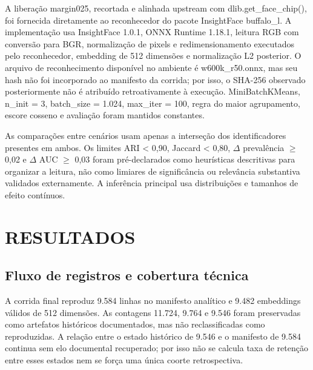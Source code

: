 
A liberação margin025, recortada e alinhada upstream com dlib.get\_face\_chip(), foi fornecida diretamente ao reconhecedor do pacote InsightFace buffalo\_l. A implementação usa InsightFace 1.0.1, ONNX Runtime 1.18.1, leitura RGB com conversão para BGR, normalização de pixels e redimensionamento executados pelo reconhecedor, embedding de 512 dimensões e normalização L2 posterior. O arquivo de reconhecimento disponível no ambiente é w600k\_r50.onnx, mas seu hash não foi incorporado ao manifesto da corrida; por isso, o SHA-256 observado posteriormente não é atribuído retroativamente à execução. MiniBatchKMeans, n\_init = 3, batch\_size = 1.024, max\_iter = 100, regra do maior agrupamento, escore cosseno e avaliação foram mantidos constantes.

As comparações entre cenários usam apenas a interseção dos identificadores presentes em ambos. Os limites ARI \textless{} 0,90, Jaccard \textless{} 0,80, \textbar $\Delta$ prevalência\textbar{} $\geq$ 0,02 e \textbar $\Delta$ AUC\textbar{} $\geq$ 0,03 foram pré-declarados como heurísticas descritivas para organizar a leitura, não como limiares de significância ou relevância substantiva validados externamente. A inferência principal usa distribuições e tamanhos de efeito contínuos.

\chapter{RESULTADOS}

\section{Fluxo de registros e cobertura técnica}

A corrida final reproduz 9.584 linhas no manifesto analítico e 9.482 embeddings válidos de 512 dimensões. As contagens 11.724, 9.764 e 9.546 foram preservadas como artefatos históricos documentados, mas não reclassificadas como reproduzidas. A relação entre o estado histórico de 9.546 e o manifesto de 9.584 continua sem elo documental recuperado; por isso não se calcula taxa de retenção entre esses estados nem se força uma única coorte retrospectiva.

